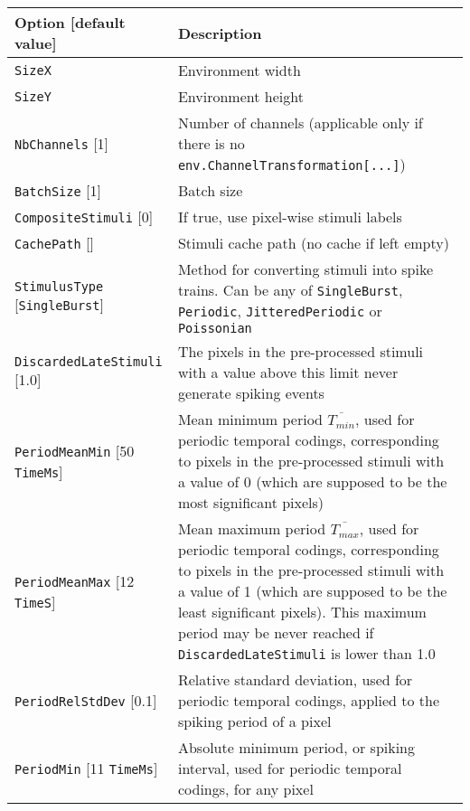 \documentclass[a4paper,11pt,oneside]{article}
\begin{document}
\begin{center}
 \begin{longtable}{| p{5cm} | p{10cm} | }
 \hline
 Option [default value] & Description\\
 \hline\hline
  \cellcolor{requiredcolor}
  \lstinline!SizeX! & Environment width \\
  \cellcolor{requiredcolor}
  \lstinline!SizeY! & Environment height \\
  \lstinline!NbChannels! [1] & Number of channels (applicable only if there is
   no \lstinline!env.ChannelTransformation[...]!) \\
  \lstinline!BatchSize! [1] & Batch size \\
  \lstinline!CompositeStimuli! [0] & If true, use pixel-wise stimuli labels \\
  \lstinline!CachePath! [] & Stimuli cache path (no cache if left empty) \\
  \hline
  \lstinline!StimulusType! [\lstinline!SingleBurst!] & Method for converting
  stimuli into spike trains. Can be any of \lstinline!SingleBurst!,
   \lstinline!Periodic!, \lstinline!JitteredPeriodic! or
   \lstinline!Poissonian! \\
  \lstinline!DiscardedLateStimuli! [1.0] & The pixels in the pre-processed
  stimuli with a value above this limit never generate spiking events \\
  \lstinline!PeriodMeanMin! [50 \lstinline!TimeMs!] & Mean minimum period
  $\overline{T_{min}}$, used for periodic temporal codings, corresponding to
  pixels in the pre-processed stimuli with a value of 0 (which are supposed to
   be the most significant pixels) \\
  \lstinline!PeriodMeanMax! [12 \lstinline!TimeS!] & Mean maximum period
  $\overline{T_{max}}$, used for periodic temporal codings, corresponding to
  pixels in the pre-processed stimuli with a value of 1 (which are supposed
  to be the least significant pixels). This maximum period may be never reached
   if \lstinline!DiscardedLateStimuli! is lower than 1.0 \\
  \lstinline!PeriodRelStdDev! [0.1] & Relative standard deviation, used for
  periodic temporal codings, applied to the spiking period of a pixel \\
  \lstinline!PeriodMin! [11 \lstinline!TimeMs!] & Absolute minimum period,
  or spiking interval, used for periodic temporal codings, for any pixel \\
 \hline
\end{longtable}
\end{center}
\end{document}
